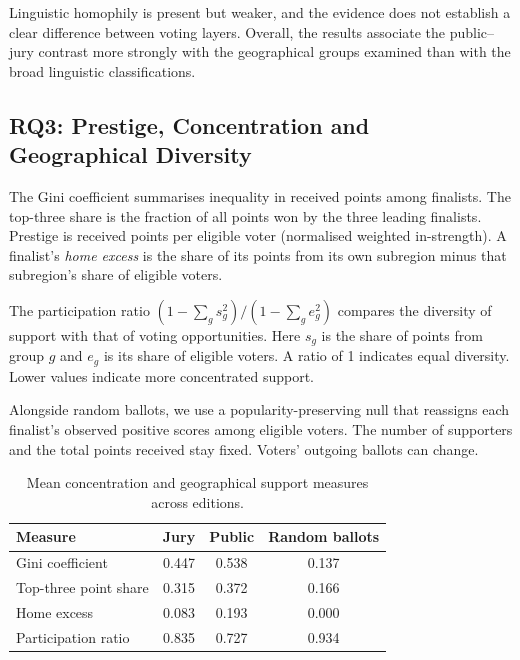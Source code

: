 \documentclass[12pt,a4paper]{article}
\begin{document}
Linguistic homophily is present but weaker,
and the evidence does not establish a clear
difference between voting layers. Overall,
the results associate the public--jury contrast more
strongly with the geographical groups examined than
with the broad linguistic classifications.








\FloatBarrier

\subsection{RQ3: Prestige, Concentration and Geographical Diversity}
\label{sec:rq3}

The Gini coefficient summarises inequality in received points among
finalists. The top-three share is the fraction of all points won by
the three leading finalists. Prestige is received points per eligible
voter (normalised weighted in-strength). A finalist's \textit{home
excess} is the share of its points from its own subregion minus
that subregion's share of eligible voters.

The participation ratio $(1-\sum_g s_g^2)/(1-\sum_g e_g^2)$ compares
the diversity of support with that of voting opportunities. Here
$s_g$ is the share of points from group $g$ and $e_g$ is its share of
eligible voters. A ratio of 1 indicates equal diversity. Lower
values indicate more concentrated support.

Alongside random ballots, we use a popularity-preserving null
that reassigns each finalist's observed positive scores among
eligible voters. The number of supporters and the total points
received stay fixed. Voters' outgoing ballots can change.

\begin{table}[htbp]
\centering
\caption{Mean concentration and geographical
support measures across editions.}
\label{tab:rq3_results}
\small
\begin{tabular}{lccc}
\toprule
\textbf{Measure} &
\textbf{Jury} &
\textbf{Public} &
\textbf{Random ballots} \\
\midrule
Gini coefficient & 0.447 & 0.538 & 0.137 \\
Top-three point share & 0.315 & 0.372 & 0.166 \\
Home excess & 0.083 & 0.193 & 0.000 \\
Participation ratio & 0.835 & 0.727 & 0.934 \\
\bottomrule
\end{tabular}
\end{table}
\end{document}
